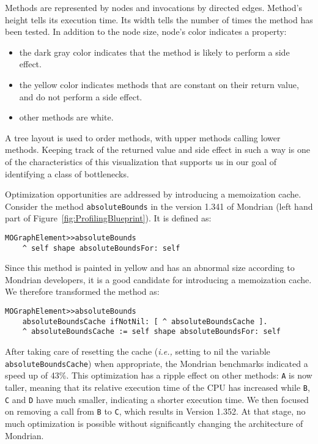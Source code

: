\documentclass[runningheads]{llncs}
\newcommand{\ct}{\lstinline[backgroundcolor=\color{white},basicstyle=\footnotesize\ttfamily]}
\newcommand{\ie}{\emph{i.e.,}\xspace}
\newcommand{\figref}[1]{Figure~\ref{fig:#1}}
\begin{document}
Methods are represented by nodes and invocations by directed edges. Method's height tells its execution time. Its width tells the number of times the method has been tested. In addition to the node size, node's color indicates a property:
\begin{itemize}
\item the dark gray color indicates that the method is likely to perform a side effect. 
\item the yellow color indicates methods that are constant on their return value, and do not perform a side effect.
\item other methods are white.
\end{itemize}

A tree layout is used to order methods, with upper methods calling lower methods.
Keeping track of the returned value and side effect in such a way is one of the characteristics of this visualization that supports us in our goal of identifying a class of bottlenecks. 

Optimization opportunities are addressed by introducing a memoization cache.
Consider the method \ct{absoluteBounds} in the version 1.341 of Mondrian (left hand part of \figref{ProfilingBlueprint}). It is defined as:

\begin{lstlisting}
MOGraphElement>>absoluteBounds
	^ self shape absoluteBoundsFor: self
\end{lstlisting}

Since this method is painted in yellow and has an abnormal size according to Mondrian developers, it is a good candidate for introducing a memoization cache. We therefore transformed the method as:

\begin{lstlisting}
MOGraphElement>>absoluteBounds
	absoluteBoundsCache ifNotNil: [ ^ absoluteBoundsCache ].
	^ absoluteBoundsCache := self shape absoluteBoundsFor: self
\end{lstlisting}

After taking care of resetting the cache (\ie setting to nil the variable \ct{absoluteBoundsCache}) when appropriate, the Mondrian benchmarks indicated a speed up of 43\%. This optimization has a ripple effect on other methods: \ct{A} is now taller, meaning that its relative execution time of the CPU has increased while \ct{B}, \ct{C} and \ct{D} have much smaller, indicating a shorter execution time. We then focused on removing a call from \ct{B} to \ct{C}, which results in Version 1.352. At that stage, no much optimization is possible without significantly changing the architecture of Mondrian.
\end{document}
